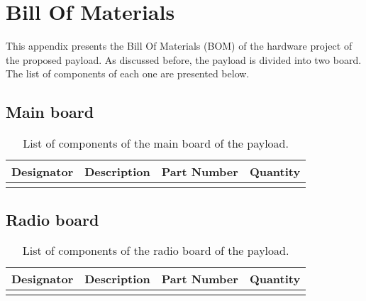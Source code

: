 %
%
%
%
%

%
%
%
%
%

\chapter{Bill Of Materials} \label{anx:bom}

This appendix presents the Bill Of Materials (BOM) of the hardware project of the proposed payload. As discussed before, the payload is divided into two board. The list of components of each one are presented below.

\section{Main board}

\begin{table}[!ht]
    \centering
    \begin{tabular}{lccc}
        \toprule[1.5pt]
        \textbf{Designator} & \textbf{Description} & \textbf{Part Number} & \textbf{Quantity} \\
        \midrule
        & & & \\
        \bottomrule[1.5pt]
    \end{tabular}
    \caption{List of components of the main board of the payload.}
    \label{tab:bom-main-board}
\end{table}

\section{Radio board}

\begin{table}[!ht]
    \centering
    \begin{tabular}{lccc}
        \toprule[1.5pt]
        \textbf{Designator} & \textbf{Description} & \textbf{Part Number} & \textbf{Quantity} \\
        \midrule
        & & & \\
        \bottomrule[1.5pt]
    \end{tabular}
    \caption{List of components of the radio board of the payload.}
    \label{tab:bom-radio-board}
\end{table}